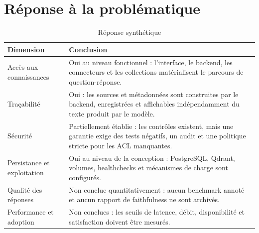 \section{Réponse à la problématique}
\begin{table}[H]
\centering
\caption{Réponse synthétique}
\label{tab:answers_ch8}
\begin{tabular}{p{4.0cm}p{9.5cm}}
\toprule
\textbf{Dimension} & \textbf{Conclusion} \\
\midrule
Accès aux connaissances & Oui au niveau fonctionnel : l’interface, le backend, les connecteurs et les collections matérialisent le parcours de question-réponse. \\
Traçabilité & Oui : les sources et métadonnées sont construites par le backend, enregistrées et affichables indépendamment du texte produit par le modèle. \\
Sécurité & Partiellement établie : les contrôles existent, mais une garantie exige des tests négatifs, un audit et une politique stricte pour les ACL manquantes. \\
Persistance et exploitation & Oui au niveau de la conception : PostgreSQL, Qdrant, volumes, healthchecks et mécanismes de charge sont configurés. \\
Qualité des réponses & Non conclue quantitativement : aucun benchmark annoté et aucun rapport de faithfulness ne sont archivés. \\
Performance et adoption & Non conclues : les seuils de latence, débit, disponibilité et satisfaction doivent être mesurés. \\
\bottomrule
\end{tabular}
\end{table}

